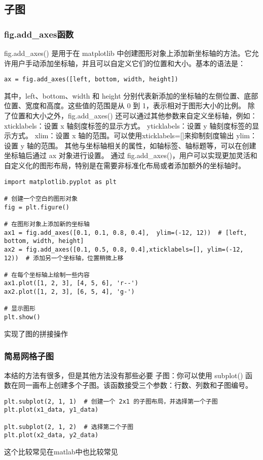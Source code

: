 \documentclass{article}
\begin{document}
\subsection{子图}


\subsubsection{fig.add\_axes函数}
fig.add\_axes() 是用于在 matplotlib 中创建图形对象上添加新坐标轴的方法。它允许用户手动添加坐标轴，并且可以自定义它们的位置和大小。基本的语法是：
\begin{lstlisting}[caption={示例Python代码}]
ax = fig.add_axes([left, bottom, width, height])
\end{lstlisting}
其中，left、bottom、width 和 height 分别代表新添加的坐标轴的左侧位置、底部位置、宽度和高度。这些值的范围是从 0 到 1，表示相对于图形大小的比例。
除了位置和大小之外，fig.add\_axes() 还可以通过其他参数来自定义坐标轴，例如：
xticklabels：设置 x 轴刻度标签的显示方式。
yticklabels：设置 y 轴刻度标签的显示方式。
xlim：设置 x 轴的范围。可以使用xticklabels=[]来抑制刻度输出
ylim：设置 y 轴的范围。
其他与坐标轴相关的属性，如轴标签、轴标题等，可以在创建坐标轴后通过 ax 对象进行设置。
通过 fig.add\_axes()，用户可以实现更加灵活和自定义化的图形布局，特别是在需要非标准化布局或者添加额外的坐标轴时。
\begin{lstlisting}[caption={示例Python代码}]
import matplotlib.pyplot as plt

# 创建一个空白的图形对象
fig = plt.figure()

# 在图形对象上添加新的坐标轴
ax1 = fig.add_axes([0.1, 0.1, 0.8, 0.4],  ylim=(-12, 12))  # [left, bottom, width, height]
ax2 = fig.add_axes([0.1, 0.5, 0.8, 0.4],xticklabels=[], ylim=(-12, 12))  # 添加另一个坐标轴，位置稍微上移

# 在每个坐标轴上绘制一些内容
ax1.plot([1, 2, 3], [4, 5, 6], 'r--')
ax2.plot([1, 2, 3], [6, 5, 4], 'g-')

# 显示图形
plt.show()
\end{lstlisting}
实现了图的拼接操作
\subsubsection{简易网格子图}
本结的方法有很多，但是其他方法没有那些必要
子图：你可以使用 subplot() 函数在同一画布上创建多个子图。该函数接受三个参数：行数、列数和子图编号。
\begin{lstlisting}[caption={示例Python代码}]
plt.subplot(2, 1, 1)  # 创建一个 2x1 的子图布局，并选择第一个子图
plt.plot(x1_data, y1_data)

plt.subplot(2, 1, 2)  # 选择第二个子图
plt.plot(x2_data, y2_data)
\end{lstlisting}
这个比较常见在matlab中也比较常见
\end{document}
